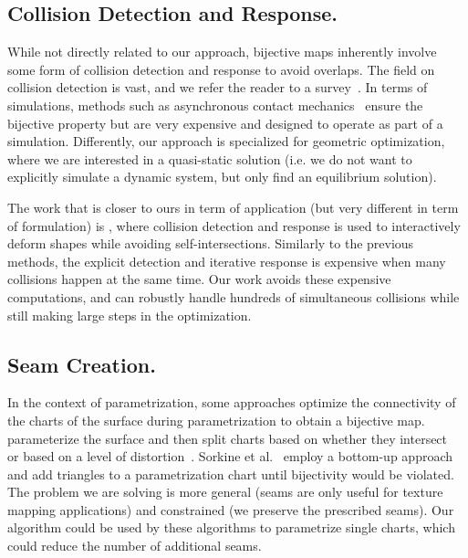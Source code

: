 \subsection*{Collision Detection and Response.}
While not directly related to our approach, bijective maps inherently  involve some form of collision detection and response to avoid overlaps.  The field on collision detection is vast, and we refer the reader to a survey~\cite{jimenez:2001}. In terms of simulations, methods such as asynchronous contact mechanics~\cite{Harmon:2009,harmon2010robust,Ainsley:2012} ensure the bijective property but are very expensive and designed to operate as part of a simulation. Differently, our approach is specialized for geometric optimization, where we are interested in a  quasi-static solution (i.e. we do not want to explicitly simulate a dynamic system, but only find an equilibrium solution).

The work that is closer to ours in term of application (but very different in term of formulation) is \cite{Harmon:2011}, where collision detection and response is used to interactively deform shapes while avoiding self-intersections. Similarly to the previous methods, the explicit detection and iterative response is expensive when many collisions happen at the same time.  Our work avoids these expensive computations, and can robustly handle hundreds of simultaneous collisions while still making large steps in the optimization.

\subsection*{Seam Creation.}
In the context of parametrization, some approaches optimize the connectivity of the charts of the surface during parametrization to obtain a bijective map.  \cite{Levy:2002,Zhou:2004} parameterize the surface and then split charts based on whether they intersect~\cite{Levy:2002} or based on a level of distortion~\cite{Zhou:2004}.  Sorkine et al.~\cite{Sorkine:2002} employ a bottom-up approach and add triangles to a parametrization chart until bijectivity would be violated. The problem we are solving is more general (seams are only useful for texture mapping applications) and constrained (we preserve the prescribed seams). Our algorithm could be used by these algorithms to parametrize single charts, which could reduce the number of additional seams.

